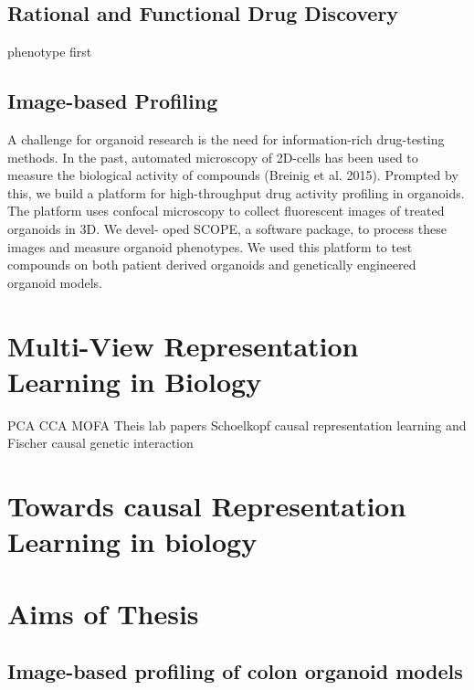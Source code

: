 \begin{flushleft}
\subsection{Rational and Functional Drug Discovery}
phenotype first

\subsection{Image-based Profiling}
A challenge for organoid research is the need for information-rich drug-testing methods. In the past, automated microscopy of 2D-cells has been used to measure the biological activity of compounds (Breinig et al. 2015). Prompted by this, we build a platform for high-throughput drug activity profiling in organoids. The platform uses confocal microscopy to collect fluorescent images of treated organoids in 3D. We devel- oped SCOPE, a software package, to process these images and measure organoid phenotypes. We used this platform to test compounds on both patient derived organoids and genetically engineered organoid models.

\section{Multi-View Representation Learning in Biology}
PCA
CCA
MOFA
Theis lab papers
Schoelkopf causal representation learning and Fischer causal genetic interaction

\section{Towards causal Representation Learning in biology}

\section{Aims of Thesis}
\subsection{Image-based profiling of colon organoid models}


\end{flushleft}
